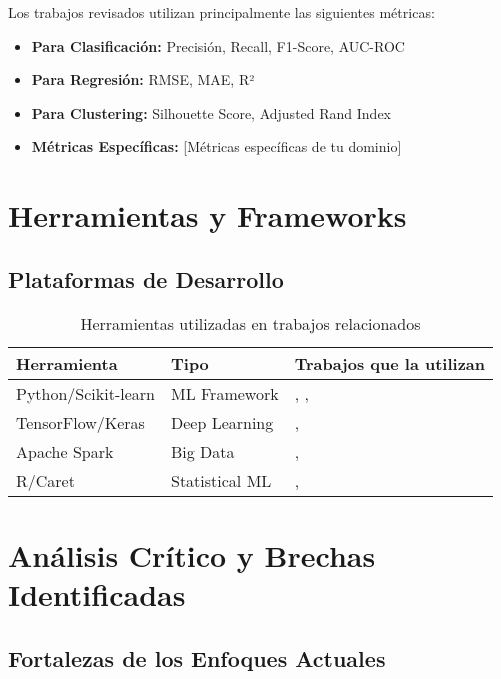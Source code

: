 Los trabajos revisados utilizan principalmente las siguientes métricas:

\begin{itemize}
    \item \textbf{Para Clasificación:} Precisión, Recall, F1-Score, AUC-ROC
    \item \textbf{Para Regresión:} RMSE, MAE, R²
    \item \textbf{Para Clustering:} Silhouette Score, Adjusted Rand Index
    \item \textbf{Métricas Específicas:} [Métricas específicas de tu dominio]
\end{itemize}

\section{Herramientas y Frameworks}

\subsection{Plataformas de Desarrollo}

\begin{table}[htbp]
\centering
\caption{Herramientas utilizadas en trabajos relacionados}
\begin{tabular}{@{}p{3cm}p{4cm}p{6cm}@{}}
\toprule
\textbf{Herramienta} & \textbf{Tipo} & \textbf{Trabajos que la utilizan} \\
\midrule
Python/Scikit-learn & ML Framework & \citet{autor1}, \citet{autor2}, \citet{autor3} \\
TensorFlow/Keras & Deep Learning & \citet{autor4}, \citet{autor5} \\
Apache Spark & Big Data & \citet{autor6}, \citet{autor7} \\
R/Caret & Statistical ML & \citet{autor8}, \citet{autor9} \\
\bottomrule
\end{tabular}
\label{tab:herramientas}
\end{table}

\section{Análisis Crítico y Brechas Identificadas}

\subsection{Fortalezas de los Enfoques Actuales}

